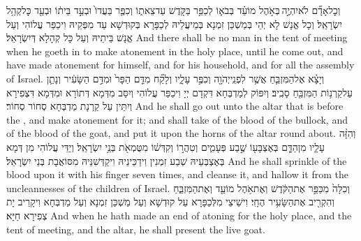 {וְכׇל\maqqaf אָדָ֞ם לֹא\maqqaf יִהְיֶ֣ה \legarmeh  בְּאֹ֣הֶל מוֹעֵ֗ד בְּבֹא֛וֹ לְכַפֵּ֥ר בַּקֹּ֖דֶשׁ עַד\maqqaf צֵאת֑וֹ וְכִפֶּ֤ר בַּעֲדוֹ֙ וּבְעַ֣ד בֵּית֔וֹ וּבְעַ֖ד כׇּל\maqqaf קְהַ֥ל יִשְׂרָאֵֽל׃}
{וְכָל אֱנָשׁ לָא יְהֵי בְּמַשְׁכַּן זִמְנָא בְּמֵיעֲלֵיהּ לְכַפָּרָא בְּקוּדְשָׁא עַד מִפְּקֵיהּ וִיכַפַּר עֲלוֹהִי וְעַל אֱנָשׁ בֵּיתֵיהּ וְעַל כָּל קְהָלָא דְּיִשְׂרָאֵל׃}
{And there shall be no man in the tent of meeting when he goeth in to make atonement in the holy place, until he come out, and have made atonement for himself, and for his household, and for all the assembly of Israel.}{}
{וְיָצָ֗א אֶל\maqqaf הַמִּזְבֵּ֛חַ אֲשֶׁ֥ר לִפְנֵֽי\maqqaf יְהֹוָ֖ה וְכִפֶּ֣ר עָלָ֑יו וְלָקַ֞ח מִדַּ֤ם הַפָּר֙ וּמִדַּ֣ם הַשָּׂעִ֔יר וְנָתַ֛ן עַל\maqqaf קַרְנ֥וֹת הַמִּזְבֵּ֖חַ סָבִֽיב׃}
{וְיִפּוֹק לְמַדְבְּחָא דִּקְדָם יְיָ וִיכַפַּר עֲלוֹהִי וְיִסַּב מִדְּמָא דְּתוֹרָא וּמִדְּמָא דִּצְפִירָא וְיִתֵּין עַל קַרְנָת מַדְבְּחָא סְחוֹר סְחוֹר׃}
{And he shall go out unto the altar that is before the \lord, and make atonement for it; and shall take of the blood of the bullock, and of the blood of the goat, and put it upon the horns of the altar round about.}{}
{וְהִזָּ֨ה עָלָ֧יו מִן\maqqaf הַדָּ֛ם בְּאֶצְבָּע֖וֹ שֶׁ֣בַע פְּעָמִ֑ים וְטִהֲר֣וֹ וְקִדְּשׁ֔וֹ מִטֻּמְאֹ֖ת בְּנֵ֥י יִשְׂרָאֵֽל׃}
{וְיַדֵּי עֲלוֹהִי מִן דְּמָא בְּאֶצְבְּעֵיהּ שְׁבַע זִמְנִין וִידַכֵּינֵיהּ וִיקַדְּשִׁנֵּיהּ מִסּוֹאֲבָת בְּנֵי יִשְׂרָאֵל׃}
{And he shall sprinkle of the blood upon it with his finger seven times, and cleanse it, and hallow it from the uncleannesses of the children of Israel.}{}
{וְכִלָּה֙ מִכַּפֵּ֣ר אֶת\maqqaf הַקֹּ֔דֶשׁ וְאֶת\maqqaf אֹ֥הֶל מוֹעֵ֖ד וְאֶת\maqqaf הַמִּזְבֵּ֑חַ וְהִקְרִ֖יב אֶת\maqqaf הַשָּׂעִ֥יר הֶחָֽי׃}
{וִישֵׁיצֵי מִלְּכַפָּרָא עַל קוּדְשָׁא וְעַל מַשְׁכַּן זִמְנָא וְעַל מַדְבְּחָא וִיקָרֵיב יָת צְפִירָא חַיָּא׃}
{And when he hath made an end of atoning for the holy place, and the tent of meeting, and the altar, he shall present the live goat.}{}
